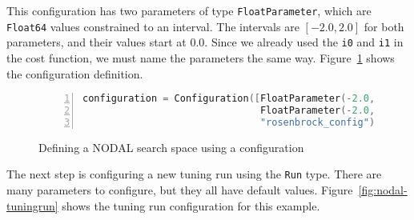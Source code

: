 This configuration has two parameters of type \texttt{FloatParameter}, which
are \texttt{Float64} values constrained to an interval. The intervals are
$[-2.0, 2.0]$ for both parameters, and their values start at $0.0$. Since we
already used the \texttt{i0} and \texttt{i1} in the cost function, we must name
the parameters the same way. Figure~\ref{fig:nodal-configuration} shows
the configuration definition.

\begin{figure}[htpb]
    \begin{minipage}{\linewidth}
    \begin{lstlisting}[language=C, basicstyle=\ttfamily\scriptsize,
        numbers=left,
        frame=no, showspaces=false, showstringspaces=false,
        numberstyle=\scriptsize,
        xleftmargin=1.5cm,
        keywords={%
            @spawnat, remotecall, Nullable, Any,
            @fetch, Future, Array, Float64, julia,
            while, true, function, end, put!,
            take!, sleep, RemoteChannel, Channel,
            Int, Tuple, const, addprocs, @schedule,
            @everywhere, for, in, myid, @async,
            remote_do, workers, Result, Real,
            AbstractFloat, deepcopy, rand, exp, true,
            Function, false, Run, mutable, struct,
            begin, Configuration, Dict, Symbol, using, import,
            FloatParameter,
            ResultChannel, AbstractChannel, return%
        },
        otherkeywords={::, \&, \*, +, -, /, [, ], >, <, put!, take!, neighbor!,
                       update!}
    ]
configuration = Configuration([FloatParameter(-2.0, 2.0, 0.0, "i0"),
                               FloatParameter(-2.0, 2.0, 0.0, "i1")],
                               "rosenbrock_config")
    \end{lstlisting}
    \end{minipage}
    \caption{Defining a NODAL search space using a configuration}
    \label{fig:nodal-configuration}
\end{figure}

The next step is configuring a new tuning run using the \texttt{Run} type.
There are many parameters to configure, but they all have default values.
Figure~\ref{fig:nodal-tuningrun} shows the tuning run configuration for this
example.

